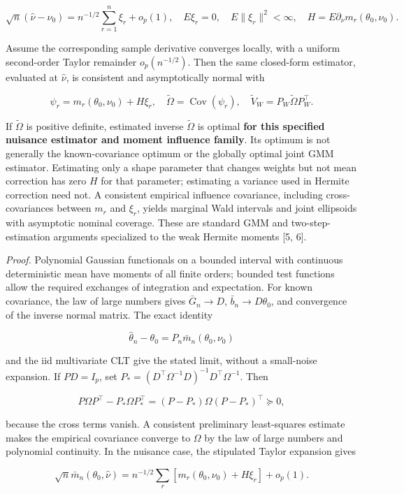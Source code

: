 \documentclass[
  american,
  11pt,
]{article}
\begin{document}
\[
\sqrt n(\widehat\nu-\nu_0)=n^{-1/2}\sum_{r=1}^n\xi_r+o_p(1),
\quad E\xi_r=0,\quad E\|\xi_r\|^2<\infty,
\quad H=E\partial_\nu m_r(\theta_0,\nu_0).
\]

Assume the corresponding sample derivative converges locally, with a
uniform second-order Taylor remainder \(o_p(n^{-1/2})\). Then the same
closed-form estimator, evaluated at \(\widehat\nu\), is consistent and
asymptotically normal with

\[
\psi_r=m_r(\theta_0,\nu_0)+H\xi_r,
\quad \widetilde\Omega=\operatorname{Cov}(\psi_r),
\quad \widetilde V_W=P_W\widetilde\Omega P_W^\top.
\]

If \(\widetilde\Omega\) is positive definite, estimated inverse
\(\widetilde\Omega\) is optimal \textbf{for this specified nuisance
estimator and moment influence family}. Its optimum is not generally the
known-covariance optimum or the globally optimal joint GMM estimator.
Estimating only a shape parameter that changes weights but not mean
correction has zero \(H\) for that parameter; estimating a variance used
in Hermite correction need not. A consistent empirical influence
covariance, including cross-covariances between \(m_r\) and \(\xi_r\),
yields marginal Wald intervals and joint ellipsoids with asymptotic
nominal coverage. These are standard GMM and two-step-estimation
arguments specialized to the weak Hermite moments {[}5, 6{]}.

\emph{Proof.} Polynomial Gaussian functionals on a bounded interval with
continuous deterministic mean have moments of all finite orders; bounded
test functions allow the required exchanges of integration and
expectation. For known covariance, the law of large numbers gives
\(\bar G_n\to D\), \(\bar b_n\to D\theta_0\), and convergence of the
inverse normal matrix. The exact identity

\[
\widehat\theta_n-\theta_0=P_n\bar m_n(\theta_0,\nu_0)
\]

and the iid multivariate CLT give the stated limit, without a
small-noise expansion. If \(P D=I_p\), set
\(P_*= (D^\top\Omega^{-1}D)^{-1}D^\top\Omega^{-1}\). Then

\[
P\Omega P^\top-P_*\Omega P_*^\top
=(P-P_*)\Omega(P-P_*)^\top\succeq0,
\]

because the cross terms vanish. A consistent preliminary least-squares
estimate makes the empirical covariance converge to \(\Omega\) by the
law of large numbers and polynomial continuity. In the nuisance case,
the stipulated Taylor expansion gives

\[
\sqrt n\bar m_n(\theta_0,\widehat\nu)
=n^{-1/2}\sum_r[m_r(\theta_0,\nu_0)+H\xi_r]+o_p(1).
\]
\end{document}
